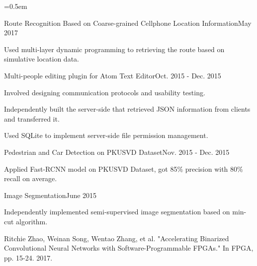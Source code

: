 \documentclass{joel_cv}
\begin{document}
	
	\parskip=0.5em
	
	\begin{sectionContentSimple}{Route Recognition Based on Coarse-grained Cellphone Location Information}{May 2017}
	\item Used multi-layer dynamic programming to retrieving the route based on simulative location data.
	\end{sectionContentSimple}
	\vspace{-0.2em}
	\begin{sectionContentSimple}{Multi-people editing plugin for Atom Text Editor}{Oct. 2015 - Dec. 2015}
	\item Involved designing communication protocols and usability testing.
	\item Independently built the server-side that retrieved JSON information from clients and transferred it.
	\item Used SQLite to implement server-side file permission management.
	\end{sectionContentSimple}
	\vspace{-0.2em}
	\begin{sectionContentSimple}{Pedestrian and Car Detection on PKUSVD Dataset}{Nov. 2015 - Dec. 2015}
	\item Applied Fast-RCNN model on PKUSVD Dataset, got 85\% precision with 80\% recall on average.
	\end{sectionContentSimple}
	\vspace{-0.2em}
	\begin{sectionContentSimple}{Image Segmentation}{June 2015}
	\item Independently implemented semi-supervised image segmentation based on min-cut algorithm.
	\end{sectionContentSimple}
	
	\begin{sectionContentNaive}
	
	\item Ritchie Zhao, Weinan Song, Wentao Zhang, et al. "Accelerating Binarized Convolutional Neural Networks with Software-Programmable FPGAs." In FPGA, pp. 15-24. 2017.
	
	\end{sectionContentNaive}
	
	
	
	
\end{document}
